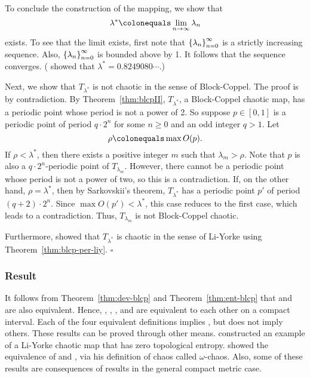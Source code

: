 \documentclass[10pt,twoside,draft]{book}
\begin{document}
\begin{example}
To conclude the construction of the mapping, we show that
\begin{equation*}
  \lambda^* \ceq \lim\limits_{n \to \infty} \lambda_n
\end{equation*}
exists.
To see that the limit exists, first note that $\left \{ \lambda_n \right \}^{\infty}_{n = 0}$ is a strictly increasing sequence.
Also, $\left \{ \lambda_n \right \}^{\infty}_{n = 0}$ is bounded above by 1.
It follows that the sequence converges.
(\citet{misiurewicz1} showed that $\lambda^* = 0.8249080 \cdots$.)

Next, we show that $T_{\lambda^*}$ is not chaotic in the sense of Block-Coppel.
The proof is by contradiction.
By Theorem~\ref{thm:blcpII}, $T_{\lambda^*}$, a Block-Coppel chaotic map, has a periodic point whose period is not a power of 2.
So suppose $p \in [0,1]$ is a periodic point of period $q\cdot 2^n$ for some $n \geq 0$ and an odd integer $q > 1$.
Let 
\begin{equation*}
  \rho \ceq \max O(p).
\end{equation*}
If $\rho < \lambda^*$, then there exists a positive integer $m$ such that $\lambda_m > \rho$.
Note that $p$ is also a $q\cdot 2^n$-periodic point of $T_{\lambda_m}$.
However, there cannot be a periodic point whose period is not a power of two, so this is a contradiction.
If, on the other hand, $\rho = \lambda^*$, then by Sarkovskii's theorem, $T_{\lambda^*}$ has a periodic point $p'$ of period $(q+2)\cdot 2^n$.
Since $\max O(p') < \lambda^*$, this case reduces to the first case, which leads to a contradiction.
Thus, $T_{\lambda_m}$ is not Block-Coppel chaotic.

Furthermore, \citet[p.146]{blockcoppel} showed that $T_{\lambda^*}$ is chaotic in the sense of Li-Yorke using Theorem~\ref{thm:blcp-per-liy}. $\square$
\label{eg:counterexample}
\end{example}

\subsubsection*{Result}
It follows from Theorem~\ref{thm:dev-blcp} and Theorem~\ref{thm:ent-blcp} that \dev and \pte are also equivalent.
Hence, \dev, \wig, \blcp, and \pte are equivalent to each other on a compact interval.
Each of the four equivalent definitions implies \liy, but \liy does not imply others.
These results can be proved through other means.
\citet{smital} constructed an example of a Li-Yorke chaotic map that has zero topological entropy.
\citet{omegachaos} showed the equivalence of \dev and \pte, via his definition of chaos called $\omega$-chaos.
Also, some of these results are consequences of results in the general compact metric case.
\end{document}
